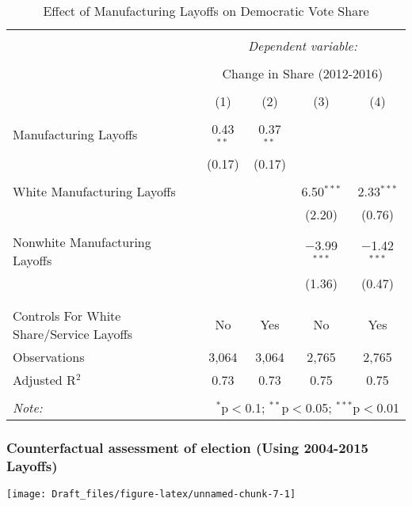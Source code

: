 \documentclass[
  12pt,
]{article}
\begin{document}
\begin{table}[!htbp] \centering 
  \caption{Effect of Manufacturing Layoffs on Democratic Vote Share} 
  \label{} 
\begin{tabular}{@{\extracolsep{5pt}}lcccc} 
\\[-1.8ex]\hline 
\hline \\[-1.8ex] 
 & \multicolumn{4}{c}{\textit{Dependent variable:}} \\ 
\cline{2-5} 
\\[-1.8ex] & \multicolumn{4}{c}{Change in Share (2012-2016)} \\ 
\\[-1.8ex] & (1) & (2) & (3) & (4)\\ 
\hline \\[-1.8ex] 
 Manufacturing Layoffs & 0.43$^{**}$ & 0.37$^{**}$ &  &  \\ 
  & (0.17) & (0.17) &  &  \\ 
  & & & & \\ 
 White Manufacturing Layoffs &  &  & 6.50$^{***}$ & 2.33$^{***}$ \\ 
  &  &  & (2.20) & (0.76) \\ 
  & & & & \\ 
 Nonwhite Manufacturing Layoffs &  &  & $-$3.99$^{***}$ & $-$1.42$^{***}$ \\ 
  &  &  & (1.36) & (0.47) \\ 
  & & & & \\ 
\hline \\[-1.8ex] 
Controls For White Share/Service Layoffs & No & Yes & No & Yes \\ 
Observations & 3,064 & 3,064 & 2,765 & 2,765 \\ 
Adjusted R$^{2}$ & 0.73 & 0.73 & 0.75 & 0.75 \\ 
\hline 
\hline \\[-1.8ex] 
\textit{Note:}  & \multicolumn{4}{r}{$^{*}$p$<$0.1; $^{**}$p$<$0.05; $^{***}$p$<$0.01} \\ 
\end{tabular} 
\end{table}

\newpage

\hypertarget{counterfactual-assessment-of-election-using-2004-2015-layoffs}{%
\subsubsection{Counterfactual assessment of election (Using 2004-2015
Layoffs)}\label{counterfactual-assessment-of-election-using-2004-2015-layoffs}}

\texttt{[image: Draft\_files/figure-latex/unnamed-chunk-7-1]}
\end{document}
